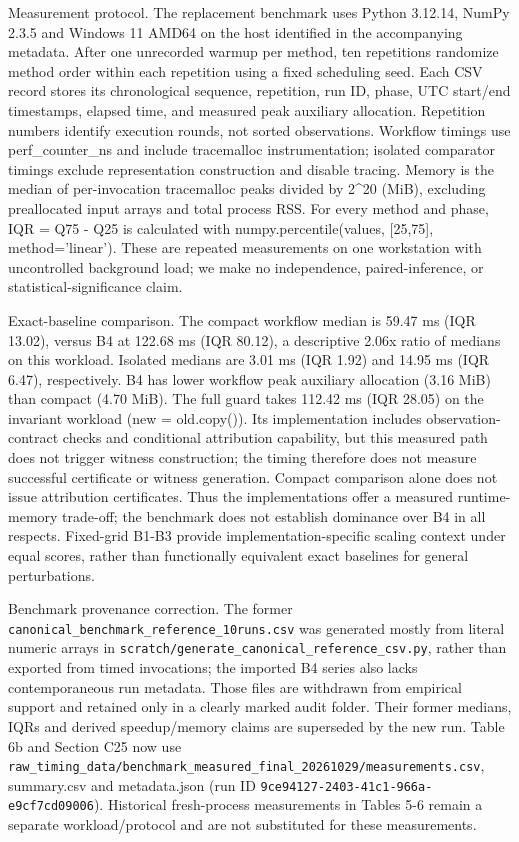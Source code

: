 \documentclass[11pt,a4paper]{article}
\begin{document}
Measurement protocol. The replacement benchmark uses Python 3.12.14, NumPy 2.3.5 and Windows 11 AMD64 on the host identified in the accompanying metadata. After one unrecorded warmup per method, ten repetitions randomize method order within each repetition using a fixed scheduling seed. Each CSV record stores its chronological sequence, repetition, run ID, phase, UTC start/end timestamps, elapsed time, and measured peak auxiliary allocation. Repetition numbers identify execution rounds, not sorted observations. Workflow timings use perf\_counter\_ns and include tracemalloc instrumentation; isolated comparator timings exclude representation construction and disable tracing. Memory is the median of per-invocation tracemalloc peaks divided by 2\textasciicircum{}20 (MiB), excluding preallocated input arrays and total process RSS. For every method and phase, IQR = Q75 - Q25 is calculated with numpy.percentile(values, [25,75], method='linear'). These are repeated measurements on one workstation with uncontrolled background load; we make no independence, paired-inference, or statistical-significance claim.

Exact-baseline comparison. The compact workflow median is 59.47 ms (IQR 13.02), versus B4 at 122.68 ms (IQR 80.12), a descriptive 2.06x ratio of medians on this workload. Isolated medians are 3.01 ms (IQR 1.92) and 14.95 ms (IQR 6.47), respectively. B4 has lower workflow peak auxiliary allocation (3.16 MiB) than compact (4.70 MiB). The full guard takes 112.42 ms (IQR 28.05) on the invariant workload (new = old.copy()). Its implementation includes observation-contract checks and conditional attribution capability, but this measured path does not trigger witness construction; the timing therefore does not measure successful certificate or witness generation. Compact comparison alone does not issue attribution certificates. Thus the implementations offer a measured runtime-memory trade-off; the benchmark does not establish dominance over B4 in all respects. Fixed-grid B1-B3 provide implementation-specific scaling context under equal scores, rather than functionally equivalent exact baselines for general perturbations.

Benchmark provenance correction. The former \texttt{canonical\_\allowbreak{}benchmark\_\allowbreak{}reference\_\allowbreak{}10runs.\allowbreak{}csv} was generated mostly from literal numeric arrays in \texttt{scratch/\allowbreak{}generate\_\allowbreak{}canonical\_\allowbreak{}reference\_\allowbreak{}csv.\allowbreak{}py}, rather than exported from timed invocations; the imported B4 series also lacks contemporaneous run metadata. Those files are withdrawn from empirical support and retained only in a clearly marked audit folder. Their former medians, IQRs and derived speedup/memory claims are superseded by the new run. Table 6b and Section C25 now use \texttt{raw\_\allowbreak{}timing\_\allowbreak{}data/\allowbreak{}benchmark\_\allowbreak{}measured\_\allowbreak{}final\_\allowbreak{}20261029/\allowbreak{}measurements.\allowbreak{}csv}, summary.csv and metadata.json (run ID \texttt{9ce94127-\allowbreak{}2403-\allowbreak{}41c1-\allowbreak{}966a-\allowbreak{}e9cf7cd09006}). Historical fresh-process measurements in Tables 5-6 remain a separate workload/protocol and are not substituted for these measurements.
\end{document}
